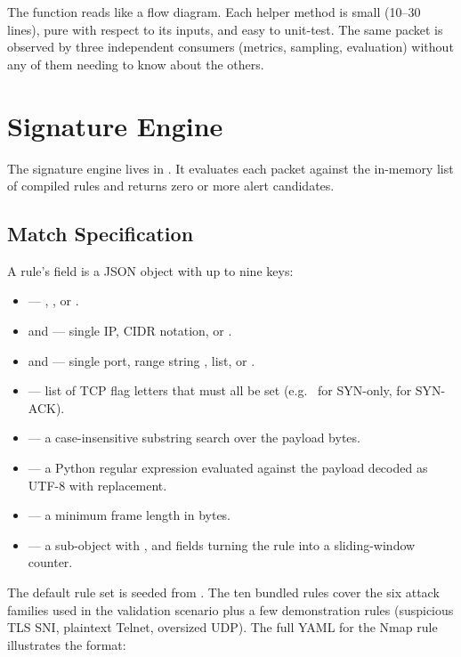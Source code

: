 The function reads like a flow diagram. Each helper method is
small (10--30 lines), pure with respect to its inputs, and easy to
unit-test. The same packet is observed by three independent
consumers (metrics, sampling, evaluation) without any of them
needing to know about the others.

\section{Signature Engine}
\label{sec:design-signature}

The signature engine lives in
. It evaluates each packet
against the in-memory list of compiled rules and returns zero or
more alert candidates.

\subsection{Match Specification}
\label{sec:design-rule-spec}

A rule's  field is a JSON object with up to nine keys:

\begin{itemize}
  \item {} --- , ,
     or .
  \item {} and  --- single IP, CIDR
    notation, or .
  \item {} and  --- single port,
    range string , list, or .
  \item {} --- list of TCP flag letters that must all be
    set (e.g.\ \code{["S"]} for SYN-only, \code{["S","A"]} for
    SYN-ACK).
  \item {} --- a case-insensitive substring search
    over the payload bytes.
  \item {} --- a Python regular expression evaluated
    against the payload decoded as UTF-8 with replacement.
  \item {} --- a minimum frame length in bytes.
  \item {} --- a sub-object with ,
     and  fields turning the rule into a
    sliding-window counter.
\end{itemize}

The default rule set is seeded from
. The ten bundled
rules cover the six attack families used in the validation
scenario plus a few demonstration rules (suspicious TLS SNI,
plaintext Telnet, oversized UDP). The full YAML for the Nmap rule
illustrates the format:

